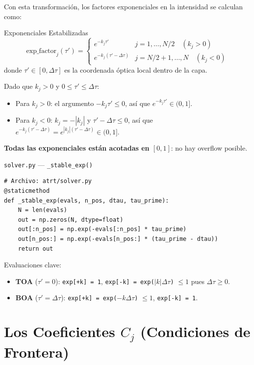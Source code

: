 \documentclass[a4paper,11pt]{article}
\begin{document}
Con esta transformaci\'on, los factores exponenciales en la intensidad se calculan como:

\begin{keyresult}{Exponenciales Estabilizadas}
\begin{equation}
\text{exp\_factor}_j(\tau') = \begin{cases}
e^{-k_j \tau'} & j = 1, \ldots, N/2 \quad (k_j > 0) \\
e^{-k_j (\tau' - \Delta\tau)} & j = N/2+1, \ldots, N \quad (k_j < 0)
\end{cases}
\label{eq:stable_exp}
\end{equation}
donde $\tau' \in [0, \Delta\tau]$ es la coordenada \'optica local dentro de la capa.
\end{keyresult}

Dado que $k_j > 0$ y $0 \leq \tau' \leq \Delta\tau$:
\begin{itemize}
\item Para $k_j > 0$: el argumento $-k_j \tau' \leq 0$, as\'i que $e^{-k_j \tau'} \in (0, 1]$.
\item Para $k_j < 0$: $k_j = -|k_j|$ y $\tau' - \Delta\tau \leq 0$, as\'i que $e^{-k_j(\tau' - \Delta\tau)} = e^{|k_j|(\tau' - \Delta\tau)} \in (0, 1]$.
\end{itemize}
\textbf{Todas las exponenciales est\'an acotadas en $[0, 1]$}: no hay overflow posible.

\begin{implementation}{\texttt{solver.py} --- \texttt{\_stable\_exp()}}
\begin{lstlisting}
# Archivo: atrt/solver.py
@staticmethod
def _stable_exp(evals, n_pos, dtau, tau_prime):
    N = len(evals)
    out = np.zeros(N, dtype=float)
    out[:n_pos] = np.exp(-evals[:n_pos] * tau_prime)
    out[n_pos:] = np.exp(-evals[n_pos:] * (tau_prime - dtau))
    return out
\end{lstlisting}
Evaluaciones clave:
\begin{itemize}
\item \textbf{TOA} ($\tau' = 0$): \texttt{exp[+k] = 1}, \texttt{exp[-k] = exp($|k|\Delta\tau$)} $\leq 1$ pues $\Delta\tau \geq 0$.
\item \textbf{BOA} ($\tau' = \Delta\tau$): \texttt{exp[+k] = exp($-k\Delta\tau$)} $\leq 1$, \texttt{exp[-k] = 1}.
\end{itemize}
\end{implementation}

\section{Los Coeficientes $C_j$ (Condiciones de Frontera)}
\label{sec:boundary}
\end{document}
